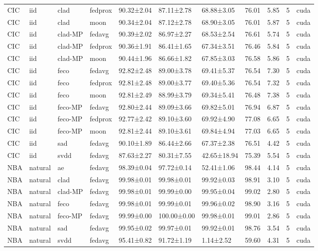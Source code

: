 \begin{tabular}{lllllllllrl}
CIC & iid & clad & fedprox & 90.32±2.04 & 87.11±2.78 & 68.88±3.05 & 76.01 & 5.85 & 5 & cuda \\
CIC & iid & clad & moon & 90.34±2.04 & 87.12±2.78 & 68.90±3.05 & 76.01 & 5.87 & 5 & cuda \\
CIC & iid & clad-MP & fedavg & 90.39±2.02 & 86.97±2.27 & 68.53±2.54 & 76.61 & 5.74 & 5 & cuda \\
CIC & iid & clad-MP & fedprox & 90.36±1.91 & 86.41±1.65 & 67.34±3.51 & 76.46 & 5.84 & 5 & cuda \\
CIC & iid & clad-MP & moon & 90.44±1.96 & 86.66±1.82 & 67.85±3.03 & 76.58 & 5.86 & 5 & cuda \\
CIC & iid & feco & fedavg & 92.82±2.48 & 89.00±3.78 & 69.41±5.37 & 76.54 & 7.30 & 5 & cuda \\
CIC & iid & feco & fedprox & 92.81±2.48 & 89.00±3.77 & 69.40±5.36 & 76.54 & 7.32 & 5 & cuda \\
CIC & iid & feco & moon & 92.81±2.49 & 88.99±3.79 & 69.34±5.41 & 76.48 & 7.38 & 5 & cuda \\
CIC & iid & feco-MP & fedavg & 92.80±2.44 & 89.09±3.66 & 69.82±5.01 & 76.94 & 6.87 & 5 & cuda \\
CIC & iid & feco-MP & fedprox & 92.77±2.42 & 89.10±3.60 & 69.92±4.90 & 77.08 & 6.65 & 5 & cuda \\
CIC & iid & feco-MP & moon & 92.81±2.44 & 89.10±3.61 & 69.84±4.94 & 77.03 & 6.65 & 5 & cuda \\
CIC & iid & sad & fedavg & 90.10±1.89 & 86.44±2.66 & 67.37±2.38 & 76.51 & 4.42 & 5 & cuda \\
CIC & iid & svdd & fedavg & 87.63±2.27 & 80.31±7.55 & 42.65±18.94 & 75.39 & 5.54 & 5 & cuda \\
NBA & natural & ae & fedavg & 98.39±0.04 & 97.72±0.14 & 52.41±1.06 & 98.44 & 4.14 & 5 & cuda \\
NBA & natural & clad & fedavg & 99.98±0.01 & 99.98±0.01 & 99.92±0.03 & 98.91 & 3.10 & 5 & cuda \\
NBA & natural & clad-MP & fedavg & 99.98±0.01 & 99.99±0.00 & 99.95±0.04 & 99.02 & 2.80 & 5 & cuda \\
NBA & natural & feco & fedavg & 99.98±0.01 & 99.99±0.01 & 99.96±0.02 & 98.90 & 3.16 & 5 & cuda \\
NBA & natural & feco-MP & fedavg & 99.99±0.00 & 100.00±0.00 & 99.98±0.01 & 99.01 & 2.86 & 5 & cuda \\
NBA & natural & sad & fedavg & 99.95±0.02 & 99.97±0.01 & 99.92±0.01 & 98.76 & 3.54 & 5 & cuda \\
NBA & natural & svdd & fedavg & 95.41±0.82 & 91.72±1.19 & 1.14±2.52 & 59.60 & 4.31 & 5 & cuda \\

\end{tabular}

